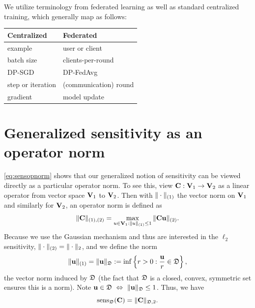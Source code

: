 \documentclass{article} %
\theoremstyle{named}
\begin{document}
We utilize terminology from federated learning as well as standard centralized training, which generally map as follows:
\begin{table}[H]
\renewcommand{\arraystretch}{1.4}%
\begin{tabular}{ll}
\toprule
\textbf{Centralized} & \textbf{Federated}  \\

\midrule
example     & user or client        \\
batch size  & clients-per-round    \\
DP-SGD      & DP-FedAvg             \\
step or iteration   & (communication) round \\
gradient            & model update           \\
\bottomrule

\end{tabular}
\end{table}

\section{Generalized sensitivity as an operator norm}\label{sec:opnorm}
\cref{eq:sensopnorm} shows that our generalized notion of sensitivity can be viewed directly as a particular operator norm. To see this, view $\mathbf{C}: \mathbf{V}_1 \rightarrow \mathbf{V}_2$ as a linear operator from vector space $\mathbf{V}_1$ to $\mathbf{V}_2$. Then with $\| \cdot \|_{(1)}$ the vector norm on $\mathbf{V}_1$ and similarly for $\mathbf{V}_2$, an operator norm is defined as
\[
\| \mathbf{C} \|_{(1),(2)} = \max_{u \in \mathbf{V}_1: \| u \|_{(1)} \le 1} \| \mathbf{C} \mathbf{u} \|_{(2)}.
\]
Because we use the Gaussian mechanism and thus are interested in the $\ell_2$ sensitivity, $\| \cdot \|_{(2)} = \| \cdot \|_2$, and we define the norm
\[
\| \mathbf{u} \|_{(1)} = \| \mathbf{u} \|_{\mathfrak{D}} := \inf \left\{ r > 0 : \frac{\mathbf{u}}{r} \in \mathfrak{D} \right\}, 
\]
the vector norm induced by $\mathfrak{D}$ (the fact that $\mathfrak{D}$ is a closed, convex, symmetric set ensures this is a norm). Note $\mathbf{u} \in \mathfrak{D}\ \Leftrightarrow\ \| \mathbf{u} \|_{\mathfrak{D}} \le 1$. Thus, we have
\begin{equation}
\operatorname{sens}_{\mathfrak{D}}(\mathbf{C}) = \| \mathbf{C} \|_{\mathfrak{D}, 2}.\label{eq:sensX}
\end{equation}
\end{document}
